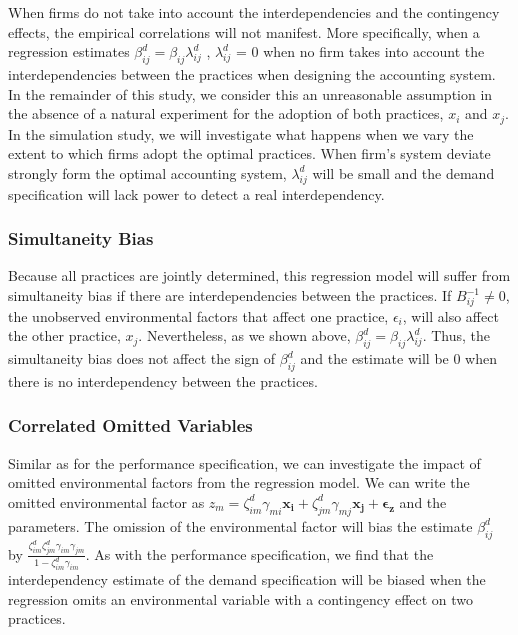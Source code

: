 \documentclass[12pt]{article}
\begin{document}
When firms do not take into account the interdependencies and the contingency effects, the empirical correlations will not manifest. More specifically, when a regression estimates $\beta^d_{ij} = \beta_{ij} \lambda^d_{ij}$ , $\lambda^d_{ij}$ = 0 when no firm takes into account the interdependencies between the practices when designing the accounting system. In the remainder of this study, we consider this an unreasonable  assumption in the absence of a natural experiment for the adoption of both practices, $x_i$ and $x_j$. In the simulation study, we will investigate what happens when we vary the extent to which firms adopt the optimal practices. When firm's system deviate strongly form the optimal accounting system, $\lambda^d_{ij}$ will be small and the demand specification will lack power to detect a real interdependency.

\subsubsection{Simultaneity Bias}

Because all practices are jointly determined, this regression model will suffer from simultaneity bias \citep{Chenhall2007} if there are interdependencies between the practices. If $B^{-1}_{ij} \neq 0$, the unobserved environmental factors that affect one practice, $\epsilon_i$, will also affect the other practice, $x_j$. Nevertheless, as we shown above, $\beta^d_{ij} = \beta_{ij} \lambda^d_{ij}$. Thus, the simultaneity bias does not affect the sign of $\beta^d_{ij}$ and the estimate will be 0 when there is no interdependency between the practices. 

\subsubsection{Correlated Omitted Variables}

Similar as for the performance specification, we can investigate the impact of omitted environmental factors from the regression model. We can write the omitted environmental factor as $z_m = \zeta_{im}^d \gamma_{mi} \mathbf{x_i} +  \zeta_{jm}^d \gamma_{mj} \mathbf{x_j} + \mathbf{\epsilon_z}$ and the parameters. The omission of the environmental factor will bias the estimate $\beta^d_{ij}$ by $\frac{\zeta^d_{im} \zeta^d_ {jm}\gamma_{im} \gamma_{jm}}{1 - \zeta^d_{im} \gamma_{im}}$. As with the performance specification, we find that the interdependency estimate of the demand specification will be biased when the regression omits an environmental variable with a contingency effect on two practices.
\end{document}
